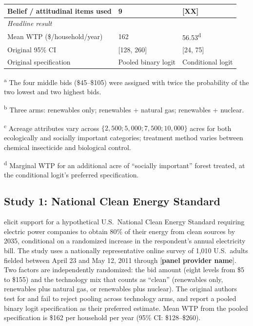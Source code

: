 \documentclass[12pt]{article}
\begin{document}
\begin{table}[h]
\begin{threeparttable}
\begin{tabular}{lll}
        Belief / attitudinal items used    & 9                              & [\textbf{XX}] \\
        \midrule
        \multicolumn{3}{l}{\textit{Headline result}} \\
        Mean WTP (\$/household/year)       & 162                            & 56.53\textsuperscript{d} \\
        Original 95\% CI                   & [128, 260]                     & [24, 75] \\
        Original specification             & Pooled binary logit            & Conditional logit \\
        \bottomrule
    \end{tabular}
    \begin{tablenotes}\footnotesize
        \item \textsuperscript{a} The four middle bids (\$45--\$105) were assigned with twice the probability of the two lowest and two highest bids.
        \item \textsuperscript{b} Three arms: renewables only; renewables + natural gas; renewables + nuclear.
        \item \textsuperscript{c} Acreage attributes vary across $\{2{,}500; 5{,}000; 7{,}500; 10{,}000\}$ acres for both ecologically and socially important categories; treatment method varies between chemical insecticide and biological control.
        \item \textsuperscript{d} Marginal WTP for an additional acre of ``socially important'' forest treated, at the conditional logit's preferred specification.
    \end{tablenotes}
    \end{threeparttable}
\end{table}

\subsection{Study 1: National Clean Energy Standard}\label{sec:data-nces}

\textcite{Aldy2012} elicit support for a hypothetical U.S.\ National Clean Energy Standard requiring electric power companies to obtain 80\% of their energy from clean sources by 2035, conditional on a randomized increase in the respondent's annual electricity bill. The study uses a nationally representative online survey of 1{,}010 U.S.\ adults fielded between April 23 and May 12, 2011 through [\textbf{panel provider name}]. Two factors are independently randomized: the bid amount (eight levels from \$5 to \$155) and the technology mix that counts as ``clean'' (renewables only, renewables plus natural gas, or renewables plus nuclear). The original authors test for and fail to reject pooling across technology arms, and report a pooled binary logit specification as their preferred estimate. Mean WTP from the pooled specification is \$162 per household per year (95\% CI: \$128--\$260).
\end{document}
